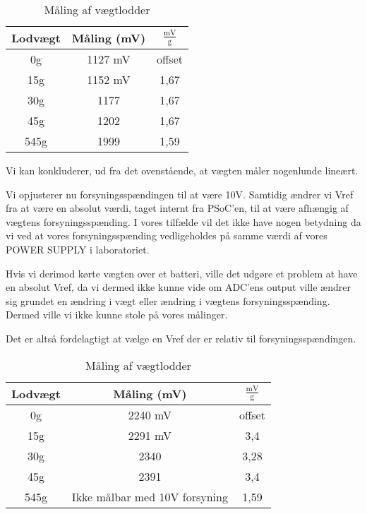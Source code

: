 \documentclass[a4paper, 11pt, articel,oneside,openany]{memoir} %
\begin{document}
\begin{table}[!htbp]
	\centering
	\caption{Måling af vægtlodder}
	\label{tbl:result_1}
	\begin{tabular}{c c c}
		Lodvægt & Måling (\si{\milli\volt}) &  $\frac{\si{\milli\volt}}{\si{\g}}$ \\
		\toprule
		0g & 1127 mV & offset \\
		\midrule
		15g & 1152 mV & 1,67 \\
		\midrule
		30g & 1177 & 1,67 \\
		\midrule
		45g & 1202 & 1,67 \\
		\midrule
		545g & 1999 & 1,59 \\
		
		\bottomrule
	\end{tabular}
\end{table}

\FloatBarrier

Vi kan konkluderer, ud fra det ovenstående, at vægten måler nogenlunde lineært.

Vi opjusterer nu forsyningsspændingen til at være 10V. Samtidig ændrer vi Vref fra at være en absolut værdi, taget internt fra PSoC'en, til at være afhængig af vægtens forsyningsspænding. I vores tilfælde vil det ikke have nogen betydning da vi ved at vores forsyningsspænding vedligeholdes på samme værdi af vores POWER SUPPLY i laboratoriet.

Hvis vi derimod kørte vægten over et batteri, ville det udgøre et problem at have en absolut Vref, da vi dermed ikke kunne vide om ADC'ens output ville ændrer sig grundet en ændring i vægt eller ændring i vægtens forsyningsspænding. Dermed ville vi ikke kunne stole på vores målinger.

Det er altså fordelagtigt at vælge en Vref der er relativ til forsyningsspændingen.


\begin{table}[!htbp]
	\centering
	\caption{Måling af vægtlodder}
	\label{tbl:result_1}
	\begin{tabular}{c c c}
		Lodvægt & Måling (\si{\milli\volt}) & $\frac{\si{\milli\volt}}{\si{\g}}$ \\
		\toprule
		0g & 2240 mV & offset \\
		\midrule
		15g & 2291 mV & 3,4 \\
		\midrule
		30g & 2340 & 3,28 \\
		\midrule
		45g & 2391 & 3,4 \\
		\midrule
		545g & Ikke målbar med 10V forsyning & 1,59 \\
		
		\bottomrule
	\end{tabular}
\end{table}
\end{document}
